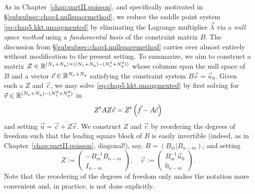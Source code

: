 As in Chapter~\ref{chap:partII.poisson}, and specifically motivated in \S\ref{subsubsec:chap4.nullspacemethod}, we reduce the saddle point system \eqref{eq:chap5.kkt.unaugmented} by eliminating the Lagrange multiplier $\vec{\lambda}$ via a \emph{null space method} using a \emph{fundamental basis} of the constraint matrix $B$. The discussion from \S\ref{subsubsec:chap4.nullspacemethod} carries over almost entirely without modification to the present setting. To summarize, we aim to construct a matrix $Z \in \mathbb{R}^{(N_x + N_y) \times ((N_x + N_y) - (N^d_x + N^d_y))}$ whose columns span the null space of $B$ and a vector $\vec{c} \in \mathbb{R}^{N_x + N_y}$ satisfying the constraint system $B \vec{c} = \vec{u}_0$. Given such a $Z$ and $\vec{c}$, we may solve \eqref{eq:chap5.kkt.unaugmented} by first solving for $\vec{v} \in \mathbb{R}^{(N_x + N_y) - (N^d_x + N^d_y)}$ in
\begin{equation} \label{eq:chap5.ztaz}
Z^tAZ \vec{v} = Z^t \left( \vec{f} - A \vec{c} \right)
\end{equation}
and setting $\vec{u} = \vec{c} + Z \vec{v}$. We construct $Z$ and $\vec{c}$ by reordering the degrees of freedom such that the leading square block of $B$ is easily invertible (indeed, as in Chapter~\ref{chap:partII.poisson}, diagonal!), say, $B = (B_m | B_{n-m})$, and setting
\begin{equation*} \label{eq:chap5.Zc}
Z := \begin{pmatrix} -B_m^{-1} B_{n-m} \\ I_{n-m} \end{pmatrix}, \quad \vec{c} := \begin{pmatrix} B_m^{-1} \vec{u}_0 \\ 0_{n-m} \end{pmatrix}.
\end{equation*}
Note that the reordering of the degrees of freedom only makes the notation more convenient and, in practice, is not done explicitly.

